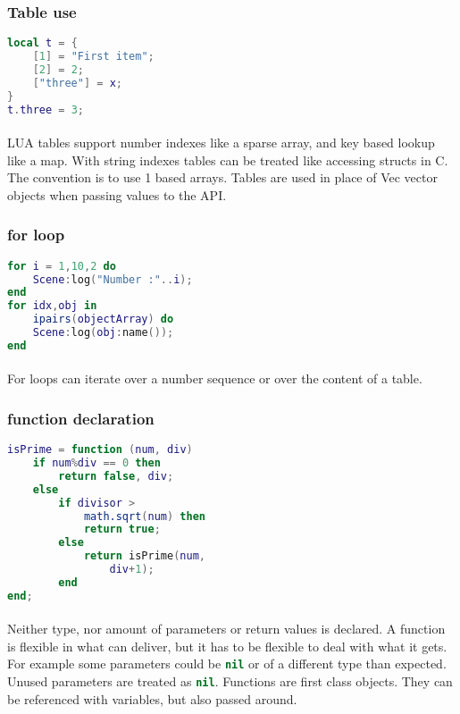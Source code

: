 \subsubsection*{Table use}
\begin{lstlisting}[language=lua]
local t = {
    [1] = "First item";
    [2] = 2;
    ["three"] = x;
}
t.three = 3;
\end{lstlisting}

\paragraph{}
LUA tables support number indexes like a sparse array, and key based lookup like a map.
With string indexes tables can be treated like accessing structs in C.
The convention is to use 1 based arrays.
Tables are used in place of Vec vector objects when passing values to the API.

\subsubsection*{for loop}
\begin{lstlisting}[language=lua]
for i = 1,10,2 do
    Scene:log("Number :"..i);
end
for idx,obj in
    ipairs(objectArray) do
    Scene:log(obj:name());
end
\end{lstlisting}

\paragraph{}
For loops can iterate over a number sequence or over the content of a table.

\subsubsection*{function declaration}
\begin{lstlisting}[language=lua]
isPrime = function (num, div)
    if num%div == 0 then
        return false, div;
    else
        if divisor >
            math.sqrt(num) then
            return true;
        else
            return isPrime(num,
                div+1);
        end
end;
\end{lstlisting}

\paragraph{}
Neither type, nor amount of parameters or return values is declared.
A function is flexible in what can deliver, but it has to be flexible to deal with what it gets.
For example some parameters could be \lstinline[language=lua]{nil} or of a different type than expected.
Unused parameters are treated as \lstinline[language=lua]{nil}.
Functions are first class objects.
They can be referenced with variables, but also passed around.


